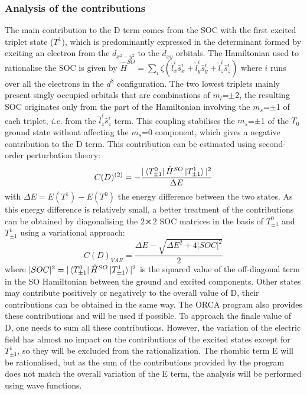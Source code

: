 \documentclass[12pt]{report}
\numberwithin{equation}{section}
\begin{document}
\subsubsection*{Analysis of the contributions}

The main contribution to the D term comes from the SOC with the first excited triplet state ($T^1$), which is predominantly expressed in the determinant formed by exciting an electron from the $d_{x^2-y^2}$ to the $d_{xy}$ orbitals.
The Hamiltonian used to rationalise the SOC is given by $\hat{H}^{SO}=\sum_{i} \zeta(\hat{l}_x^i\hat{s}_x^i+\hat{l}_y^i\hat{s}_y^i+\hat{l}_z^i\hat{s}_z^i)$ where $i$ runs over all the electrons in the $d^8$ configuration.
The two lowest triplets mainly present singly occupied orbitals that are combinations of $m_l$=$\pm$2, the resulting SOC originates only from the part of the Hamiltonian involving the $m_s$=$\pm$1 of each triplet, \textit{i.e.} from the $\hat{l}_z^i\hat{s}_z^i$ term.
This coupling stabilises the $m_s$=$\pm$1 of the $T_0$ ground state without affecting the $m_s$=0 component, which gives a negative contribution to the D term.
This contribution can be estimated using second-order perturbation theory:
\begin{equation}\label{ContrPert}
    C(D)^{(2)}=-\frac{|\bra{T^0_{\pm1}}\hat{H}^{SO}\ket{T^1_{\pm1}}|^2}{\Delta E}
\end{equation}
with $\Delta E = E(T^1)-E(T^0)$ the energy difference between the two states.
As this energy difference is relatively small, a better treatment of the contributions can be obtained by diagonalising the 2$\cross$2 SOC matrices in the basis of $T^0_{\pm1}$ and $T^1_{\pm1}$ using a variational approach:
\begin{equation}
    C(D)_{VAR}=\frac{\Delta E -\sqrt{\Delta E^2+4|SOC|^2}}{2}
\end{equation}
where $|SOC|^2={|\bra{T^0_{\pm1}}\hat{H}^{SO}\ket{T^1_{\pm1}}|^2}$ is the squared value of the off-diagonal term in the SO Hamiltonian between the ground and excited components.
Other states may contribute positively or negatively to the overall value of D, their contributions can be obtained in the same way. 
The ORCA program also provides these contributions and will be used if possible. To approach the finale value of D, one needs to sum all these contributions.
However, the variation of the electric field has almost no impact on the contributions of the excited states except for $T^1_{\pm1}$, so they will be excluded from the rationalization.
The rhombic term E will be rationalised, but as the sum of the contributions provided by the program does not match the overall variation of the E term, the analysis will be performed using wave functions.
\end{document}
